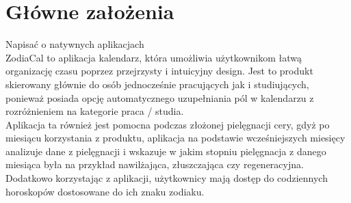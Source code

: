 \section{Główne założenia}
Napisać o natywnych aplikacjach \\

\phantom{Th} 
ZodiaCal to aplikacja kalendarz, która umożliwia użytkownikom łatwą organizację czasu poprzez przejrzysty i intuicyjny design. Jest to produkt skierowany głównie do osób jednocześnie pracujących jak i studiujących, ponieważ posiada opcję automatycznego uzupełniania pól w kalendarzu z rozróżnieniem na kategorie praca / studia.\\


Aplikacja ta również jest pomocna podczas złożonej pielęgnacji cery, gdyż po miesiącu korzystania z produktu, aplikacja na podstawie wcześniejszych miesięcy analizuje dane z pielęgnacji i wskazuje w jakim stopniu pielęgnacja z danego miesiąca była na przykład  nawilżająca, złuszczająca czy regeneracyjna. \\ 


Dodatkowo korzystając z aplikacji, użytkownicy mają dostęp do codziennych horoskopów dostosowane do ich znaku zodiaku. 
